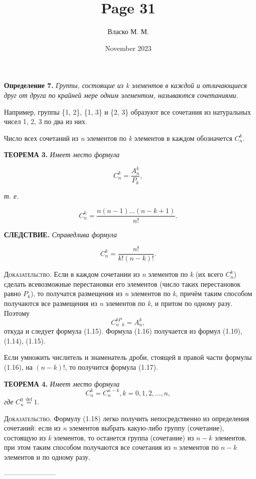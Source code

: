 \documentclass[8pt]{article}
\title{Page 31}
\author{Власко М. М.}
\date{November 2023}
\begin{document}
\Large
\textsf{\textbf{Определение 7.}}
\textit{Группы, состоящие из k элементов в каждой и отличающиеся друг от друга по крайней мере одним элементом,
    называются сочетаниями.}

Например, группы \{1, 2\}, \{1, 3\} и \{2, 3\} образуют все сочетания из натуральных чисел 1, 2, 3 по два из них.

Число всех сочетаний из \textit{n} элементов по \textit{k} элементов в каждом обозначется \(C_n^k\).


\begin{flushleft}
   \textsc{\textbf{ТЕОРЕМА 3. }}\textit{Имеет место формула}
\end{flushleft}

\[ C_n^k = \frac{A_n^k}{P_k}, \tag{1.15}\]
\begin{flushleft}
   \textit{т. е.}
\end{flushleft}
\[ C_n^k = \frac{n(n - 1)...(n - k + 1)}{n!}. \tag{1.16}\]
\begin{flushleft}
   \textsc{\textbf{СЛЕДСТВИЕ. }}\textit{Справедлива формула}
\end{flushleft}
\[ C_n^k = \frac{n!}{k!(n - k)!}. \tag{1.17}\]

\begin{flushleft}
   \textsc{Доказательство.}
Если в каждом сочетании из \textit{n} элементов по \textit{k} (их всего \(C_n^k\)) сделать всевозможные перестановки
   его элементов (число таких перестановок равно \(P_k\)), то получатся размещения из \textit{n} элементов по
   \textit{k}, причём таким способом получаются все размещения из \textit{n} элементов по \textit{k}, и притом по
   одному разу. Поэтому \[ C_n^{kP}_k = A_n^k,\] откуда и следует формула (1.15).
   Формула (1.16) получается из формул
   (1.10), (1.14), (1.15).
\end{flushleft}
\par{Если умножить числитель и знаменатель дроби, стоящей в правой части формулы (1.16), на \((n - k)\)!, то
получится формула (1.17).}
\begin{flushleft}
   \textsc{\textbf{ТЕОРЕМА 4. }}\textit{Имеет место формула}
   \[ C_n^k = C_n^{n - k}, k = 0, 1, 2, \dots, n, \tag{1.18}\]
\textit{где} \(C_n^0 \stackrel{\text{def}}{=} 1\).
\end{flushleft}
\begin{flushleft}
   \textsc{\textsf{Доказательство.}}
Формулу (1.18) легко получить непосредственно из определения сочетаний: если из \textit{n} элементов выбрать какую-либо
   группу (сочетание), состоящую из \textit{k} элементов, то останется группа (сочетание) из \(n - k\) элементов, при
   этом таким способом получаются все сочетания из \textit{n} элементов по \(n - k\) элементов и по одному разу.
\end{flushleft}

\centering
-----------------------
\end{document}
